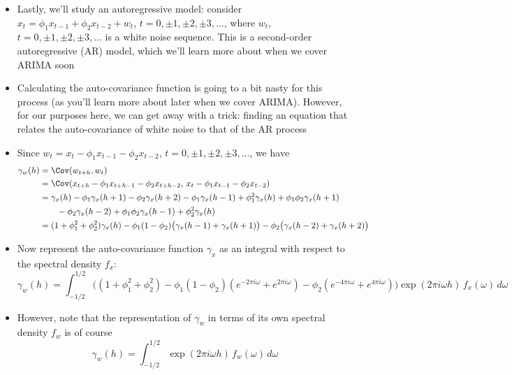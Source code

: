 \documentclass{article}
\begin{document}
\begin{itemize}
\item Lastly, we'll study an autoregressive model: consider $x_t = \phi_1
  x_{t-1} + \phi_2 x_{t-2} + w_t$, $t = 0, \pm 1, \pm 2, \pm 3, \dots$, where
  $w_t$, $t = 0, \pm 1, \pm 2, \pm 3, \dots$ is a white noise sequence. This is
  a second-order autoregressive (AR) model, which we'll learn more about when we
  cover ARIMA soon 

\item Calculating the auto-covariance function is going to a bit nasty for this 
  process (as you'll learn more about later when we cover ARIMA). However, for
  our purposes here, we can get away with a trick: finding an equation that
  relates the auto-covariance of white noise to that of the AR process 

\item Since $w_t = x_t - \phi_1 x_{t-1} - \phi_2 x_{t-2}$, $t = 0, \pm 1, \pm 2,
  \pm 3, \dots$, we have 
  \begin{align*}
  \gamma_w(h) &= \Cov(w_{t+h}, w_t) \\
  &= \Cov(x_{t+h} - \phi_1 x_{t+h-1} -  \phi_2 x_{t+h-2}, \,
    x_t - \phi_1 x_{t-1} - \phi_2 x_{t-2}) \\
  &= \gamma_x(h) - \phi_1 \gamma_x(h+1) - \phi_2 \gamma_x(h+2) 
    - \phi_1 \gamma_x(h-1) + \phi_1^2 \gamma_x(h) + \phi_1 \phi_2 
    \gamma_x(h+1) \\ 
    &\qquad - \phi_2 \gamma_x(h-2) +  \phi_1 \phi_2 \gamma_x(h-1) + \phi_2^2
    \gamma_x(h) \\
    &= (1+\phi_1^2+\phi_2^2) \gamma_x(h)  
      -\phi_1(1-\phi_2) \big( \gamma_x(h-1) + \gamma_x(h+1) \big) 
      - \phi_2 \big( \gamma_x(h-2) + \gamma_x(h+2) \big)  
  \end{align*}

\item Now represent the auto-covariance function $\gamma_x$ as an integral with
  respect to the spectral density $f_x$:
  \[
  \gamma_w(h) = \int_{-1/2}^{1/2} \Big( (1+\phi_1^2+\phi_2^2)  
  - \phi_1(1-\phi_2) (e^{-2\pi i \omega} + e^{2\pi i \omega})
  - \phi_2 (e^{-4\pi i \omega} + e^{4\pi i \omega}) \Big) \exp(2\pi i \omega
  h) \, f_x(\omega) \, d\omega
  \]

\item However, note that the representation of $\gamma_w$ in terms of its own
  spectral density $f_w$ is of course
  \[
  \gamma_w(h) = \int_{-1/2}^{1/2} \exp(2\pi i \omega h) \, f_w(\omega) \,
  d\omega 
  \]


\end{itemize}
\end{document}

